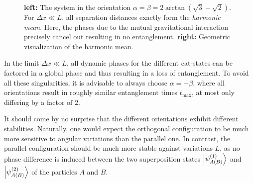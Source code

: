 \begin{figure}[!htbp]
  \centering
  \def\svgwidth{\textwidth}
  
  \caption{\textbf{left:} The system in the orientation $\alpha=\beta=2\arctan(\sqrt{3}-\sqrt{2})$. For $\Delta x \ll L$, all separation distances exactly form the \textit{harmonic mean}. Here, the phases due to the mutual gravitational interaction precisely cancel out resulting in no entanglement. \textbf{right:} Geometric visualization of the harmonic mean.}
  \label{fig:4:harmonic-mean}
\end{figure}
In the limit $\Delta x \ll L$, all dynamic phases for the different cat-states can be factored in a global phase and thus resulting in a loss of entanglement. 
To avoid all these singularities, it is advisable to always choose $\alpha=-\beta$, where all orientations result in roughly similar entanglement times $t_\mathrm{max}$, at most only differing by a factor of $2$.

It should come by no surprise that the different orientations exhibit different stabilities. Naturally, one would expect the orthogonal configuration to be much more sensitive to angular variations than the parallel one.
In contrast, the parallel configuration should be much more stable against variations $L$, as no phase difference is induced between the two superposition states $\ket{\psi^{(1)}_{A(B)}}$ and $\ket{\psi^{(2)}_{A(B)}}$ of the particles $A$ and $B$.

